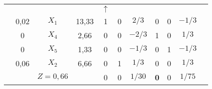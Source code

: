\begin{tabular}{ccccccccccc}
\cline{2-11}            &         &         &         & $\uparrow$ &         &         &         &         &         &  \bigstrut\\
\cline{2-11}            & 0,02    & $X_1$   & 13,33   & 1       & 0       & $2/3$   & 0       & 0       & $-1/3$  &  \bigstrut[t]\\
            & 0       & $X_4$   & 2,66    & 0       & 0       & $-2/3$  & 1       & 0       & $1/3$   &  \\
            & 0       & $X_5$   & 1,33    & 0       & 0       & $-1/3$  & 0       & 1       & $-1/3$  &  \\
            & 0,06    & $X_2$   & 6,66    & 0       & 1       & $1/3$   & 0       & 0       & $1/3$   &  \bigstrut[b]\\
\cline{2-10}            &         & $Z=0,66$ &         & 0       & 0       & $1/30$  & \textcolor[rgb]{ 0,  .439,  .753}{\textbf{0}} & 0       & $1/75$  &  \bigstrut\\
\cline{2-10}    \end{tabular}%
